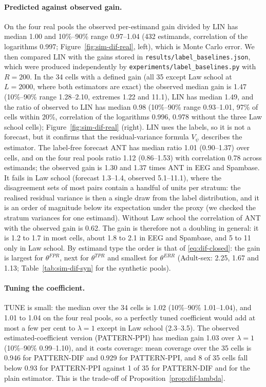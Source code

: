 \paragraph{Predicted against observed gain.} On the four real pools the observed per-estimand gain divided by LIN has median 1.00 and 10\%--90\% range 0.97--1.04 (432 estimands, correlation of the logarithms 0.997; Figure~\ref{fig:sim-dif-real}, left), which
is Monte Carlo error. We then compared LIN with the gains stored in \texttt{results/label\_baselines.json}, which were produced independently by \texttt{experiments/label\_baselines.py} with $R=200$. In the 34 cells with a defined gain (all 35 except Law school at
$L=2000$, where both estimators are exact) the observed median gain is 1.47 (10\%--90\% range 1.28--2.10, extremes 1.22 and 11.1), LIN has median 1.49, and the ratio of observed to LIN has median 0.98 (10\%--90\% range 0.93--1.01, 97\% of cells within 20\%, correlation of the logarithms 0.996, 0.978 without
the three Law school cells); Figure~\ref{fig:sim-dif-real} (right). LIN uses the labels, so it is not a forecast, but it confirms that the residual-variance formula $V_\psi$ describes the estimator. The label-free forecast
ANT has median ratio 1.01 (0.90--1.37) over cells, and on the four real pools ratio 1.12 (0.86--1.53) with correlation 0.78 across estimands; the observed gain is 1.30 and 1.37 times ANT in EEG and Spambase. It fails in Law school (forecast 1.3--1.4, observed 5.1--11.1), where the
disagreement sets of most pairs contain a handful of units per stratum: the realised residual variance is then a single draw from the label distribution, and it is an order of magnitude below its expectation under the proxy (we checked the stratum variances for one estimand). Without Law school the correlation of ANT with the observed gain is 0.62.
The gain is therefore not a doubling in general: it is 1.2 to 1.7 in most cells, about 1.8 to 2.1 in EEG and Spambase, and 5 to 11 only in Law school. By estimand type the order is that of \eqref{eq:dif-closed}: the gain is largest for $\theta^{FPR}$,
next for $\theta^{TPR}$ and smallest for $\theta^{ERR}$ (Adult-sex: 2.25, 1.67 and 1.13; Table~\ref{tab:sim-dif-syn} for the synthetic pools).

\paragraph{Tuning the coefficient.} TUNE is small: the median over the 34 cells is 1.02 (10\%--90\% 1.01--1.04), and 1.01 to 1.04 on the four real pools, so a perfectly tuned coefficient would add at most a few per cent to $\lambda=1$ except in Law school (2.3--3.5).
The observed estimated-coefficient version (PATTERN-PPI) has median gain 1.03 over $\lambda=1$ (10\%--90\% 0.99--1.10), and it costs coverage: mean coverage over the 35 cells is 0.946 for PATTERN-DIF and 0.929 for PATTERN-PPI, and 8 of 35 cells fall below 0.93 for PATTERN-PPI against 1 of 35 for PATTERN-DIF
and for the plain estimator. This is the trade-off of Proposition~\ref{prop:dif-lambda}.

